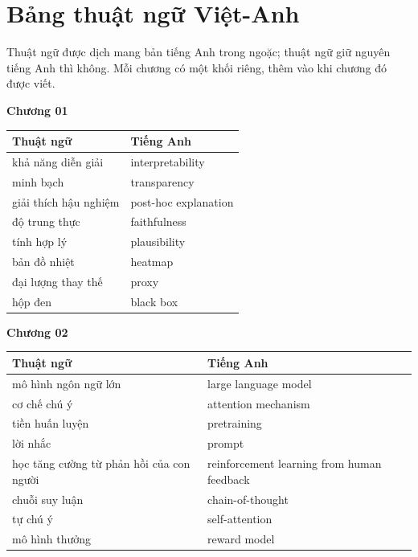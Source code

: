 \chapter{Bảng thuật ngữ Việt-Anh}
\label{app:thuat-ngu}

Thuật ngữ được dịch mang bản tiếng Anh trong ngoặc; thuật ngữ giữ nguyên
tiếng Anh thì không. Mỗi chương có một khối riêng, thêm vào khi chương đó
được viết.

\textbf{Chương 01}

\begin{tabular}{@{}lp{7cm}@{}}
\toprule
Thuật ngữ & Tiếng Anh \\
\midrule
khả năng diễn giải & interpretability \\
minh bạch & transparency \\
giải thích hậu nghiệm & post-hoc explanation \\
độ trung thực & faithfulness \\
tính hợp lý & plausibility \\
bản đồ nhiệt & heatmap \\
đại lượng thay thế & proxy \\
hộp đen & black box \\
\bottomrule
\end{tabular}

\medskip

\textbf{Chương 02}

\begin{tabular}{@{}lp{7cm}@{}}
\toprule
Thuật ngữ & Tiếng Anh \\
\midrule
mô hình ngôn ngữ lớn & large language model \\
cơ chế chú ý & attention mechanism \\
tiền huấn luyện & pretraining \\
lời nhắc & prompt \\
học tăng cường từ phản hồi của con người & reinforcement learning from human feedback \\
chuỗi suy luận & chain-of-thought \\
tự chú ý & self-attention \\
mô hình thưởng & reward model \\
\bottomrule
\end{tabular}

